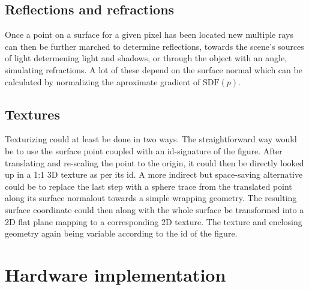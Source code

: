 	\subsection{Reflections and refractions}

                Once a point on a surface for a given pixel has been located
                new multiple rays can then be further marched to determine
                reflections, towards the scene's sources of light determening
                light and shadows, or through the object with an angle,
                simulating refractions. A lot of these depend on the surface
                normal which can be calculated by normalizing the aproximate
                gradient of $\text{SDF}(p)$. 
	
	\subsection{Textures}
		
                Texturizing could at least be done in two ways. The
                straightforward way would be to use the surface point coupled
                with an id-signature of the figure. After translating and
                re-scaling the point to the origin, it could then be directly
                looked up in a 1:1 3D texture as per its id. A more indirect
                but space-saving alternative could be to replace the last step
                with a sphere trace from the translated point along its surface
                normal\footnotemark out towards a simple wrapping geometry. The
                resulting surface coordinate could then along with the whole
                surface be transformed into a 2D flat plane mapping to a
                corresponding 2D texture. The texture and enclosing geometry
                again being variable according to the id of the figure.
	

	\section{Hardware implementation}
